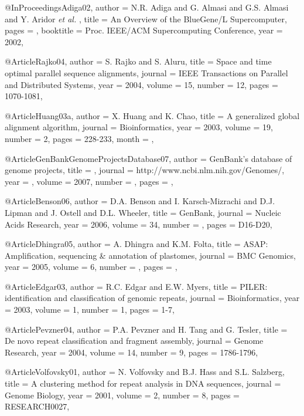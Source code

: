 @InProceedings{Adiga02,
  author =	{N.R. Adiga and G. Almasi and G.S. Almasi and Y. Aridor {\it et al.} },
  title =  {{An Overview of the BlueGene/L Supercomputer}},
  pages =        {},
  booktitle =    {Proc. IEEE/ACM Supercomputing Conference},
  year =         {2002},
}




@Article{Rajko04,
  author = {S. Rajko and S. Aluru},
  title =  {Space and time optimal parallel sequence alignments},
  journal = {IEEE Transactions on Parallel and Distributed Systems},
  year = {2004},
  volume =  {15},
  number =  {12},
  pages =   {1070-1081},
}

@Article{Huang03a,
  author =   {X. Huang and K. Chao},
  title =    {A generalized global alignment algorithm},
  journal =  {Bioinformatics},
  year =     {2003},
  volume =   {19},
  number =   {2},
  pages =    {228-233},
  month =    {},
}

@Article{GenBankGenomeProjectsDatabase07,
  author = {GenBank's database of genome projects},
  title =  {},
  journal = {http://www.ncbi.nlm.nih.gov/Genomes/},
  year = {},
  volume =  {2007},
  number =  {},
  pages =   {},
}

@Article{Benson06,
  author =       {D.A. Benson and I. Karsch-Mizrachi and D.J. Lipman and J. Ostell and D.L. Wheeler},
  title =      {{GenBank}},
  journal =     {Nucleic Acids Research},
  year =        {2006},
  volume =      {34},
  number =      {},
  pages =       {D16-D20},
}


@Article{Dhingra05,
  author = {A. Dhingra and K.M. Folta},
  title =  {ASAP: Amplification, sequencing \& annotation of plastomes},
  journal = {BMC Genomics},
  year = {2005},
  volume =  {6},
  number =  {},
  pages =   {},
}

@Article{Edgar03,
  author = {R.C. Edgar and E.W. Myers},
  title =  {{PILER: identification and classification of genomic repeats}},
  journal = {Bioinformatics},
  year = {2003},
  volume =  {1},
  number =  {1},
  pages =   {1-7},
}

@Article{Pevzner04,
  author = {P.A. Pevzner and H. Tang and G. Tesler},
  title =  {De novo repeat classification and fragment assembly},
  journal = {Genome Research},
  year = {2004},
  volume =  {14},
  number =  {9},
  pages =   {1786-1796},
}

@Article{Volfovsky01,
  author = {N. Volfovsky and B.J. Hass and S.L. Salzberg},
  title =  {{A clustering method for repeat analysis in DNA sequences}},
  journal = {Genome Biology},
  year = {2001},
  volume =  {2},
  number =  {8},
  pages =   {RESEARCH0027},
}

